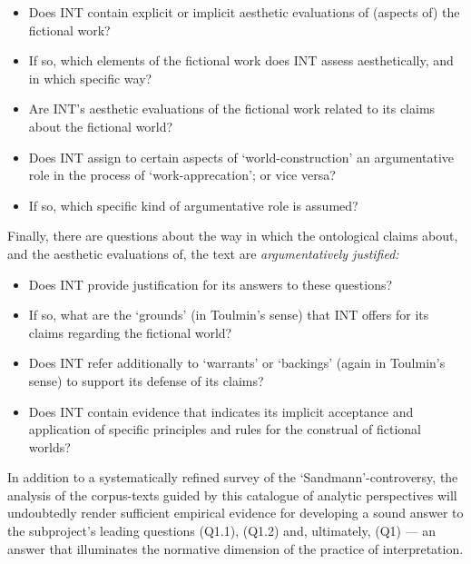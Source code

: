 \vspace{-.1cm}
\begin{itemize}[leftmargin=2cm]
\item Does INT contain explicit or implicit aesthetic evaluations of (aspects of) the fictional work? 
\vspace{-.1cm}
\item If so, which elements of the fictional work does INT assess aesthetically, and in which specific way?
\vspace{-.1cm}
\item Are INT's aesthetic evaluations of the fictional work related to its claims about the fictional world?
\vspace{-.1cm}
\item Does INT assign to certain aspects of `world-construction' an argumentative role in the process of `work-apprecation'; or vice versa?
\vspace{-.1cm}
\item If so, which specific kind of argumentative role is assumed?
\end{itemize}
\vspace{-.3cm}

\noindent Finally, there are questions about the way in which the ontological claims about, and the aesthetic evaluations of, the text are \emph{argumentatively justified:}

\vspace{-.1cm}
\begin{itemize}[leftmargin=2cm]
\item Does INT provide justification for its answers to these questions? 
\vspace{-.1cm}
\item If so, what are the `grounds' (in Toulmin's sense) that INT offers for its claims regarding the fictional world?
\vspace{-.1cm}
\item Does INT refer additionally to `warrants' or `backings' (again in Toulmin's sense) to support its defense of its claims?
\vspace{-.1cm}
\item Does INT contain evidence that indicates its implicit acceptance and application of specific principles and rules for the construal of fictional worlds?
\end{itemize}
\vspace{-.3cm}

\noindent In addition to a systematically refined survey of the `Sandmann'-controversy, the analysis of the corpus-texts guided by this catalogue of analytic perspectives will undoubtedly render sufficient empirical evidence for developing a sound answer to the subproject's leading questions (Q1.1), (Q1.2) and, ultimately, (Q1) --- an answer that illuminates the normative dimension of the practice of interpretation.

